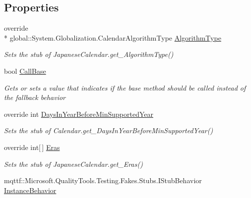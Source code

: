 \subsection*{Properties}
\begin{DoxyCompactItemize}
\item 
override \\*
global\-::\-System.\-Globalization.\-Calendar\-Algorithm\-Type \hyperlink{class_system_1_1_globalization_1_1_fakes_1_1_stub_japanese_calendar_a14c3f2b3120918f853a21f5ebaf6a493}{Algorithm\-Type}
\begin{DoxyCompactList}\small\item\em Sets the stub of Japanese\-Calendar.\-get\-\_\-\-Algorithm\-Type()\end{DoxyCompactList}\item 
bool \hyperlink{class_system_1_1_globalization_1_1_fakes_1_1_stub_japanese_calendar_a00b788914b5148788a1c3b6e7957ea55}{Call\-Base}
\begin{DoxyCompactList}\small\item\em Gets or sets a value that indicates if the base method should be called instead of the fallback behavior\end{DoxyCompactList}\item 
override int \hyperlink{class_system_1_1_globalization_1_1_fakes_1_1_stub_japanese_calendar_a4da9e7167e0c2485a83cb702bde45f77}{Days\-In\-Year\-Before\-Min\-Supported\-Year}
\begin{DoxyCompactList}\small\item\em Sets the stub of Calendar.\-get\-\_\-\-Days\-In\-Year\-Before\-Min\-Supported\-Year()\end{DoxyCompactList}\item 
override int\mbox{[}$\,$\mbox{]} \hyperlink{class_system_1_1_globalization_1_1_fakes_1_1_stub_japanese_calendar_a526dc301a8fe71badd3a673f5a866af1}{Eras}
\begin{DoxyCompactList}\small\item\em Sets the stub of Japanese\-Calendar.\-get\-\_\-\-Eras()\end{DoxyCompactList}\item 
mqttf\-::\-Microsoft.\-Quality\-Tools.\-Testing.\-Fakes.\-Stubs.\-I\-Stub\-Behavior \hyperlink{class_system_1_1_globalization_1_1_fakes_1_1_stub_japanese_calendar_af7b4d34ab2a298b176ca89bbf1faea98}{Instance\-Behavior}

\end{DoxyCompactItemize}
